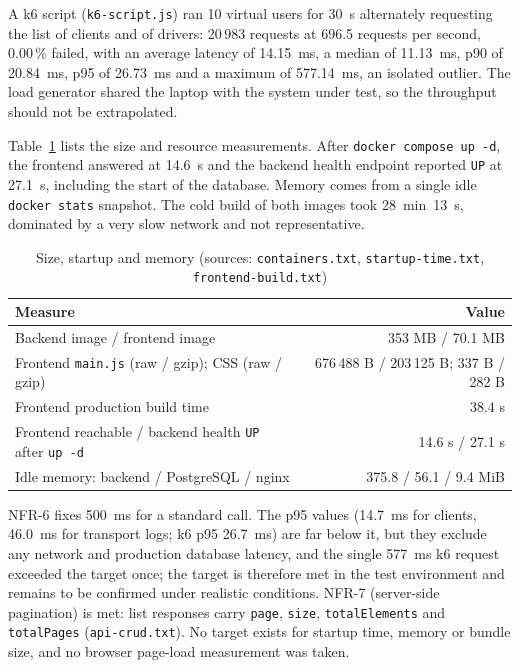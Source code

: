 A k6 script (\texttt{k6-script.js}) ran 10 virtual users for 30~s alternately requesting the list of clients and of drivers: 20\,983 requests at 696.5 requests per second, 0.00\,\% failed, with an average latency of 14.15~ms, a median of 11.13~ms, p90 of 20.84~ms, p95 of 26.73~ms and a maximum of 577.14~ms, an isolated outlier. The load generator shared the laptop with the system under test, so the throughput should not be extrapolated.

Table~\ref{tab:footprint} lists the size and resource measurements. After \texttt{docker compose up -d}, the frontend answered at 14.6~s and the backend health endpoint reported \texttt{UP} at 27.1~s, including the start of the database. Memory comes from a single idle \texttt{docker stats} snapshot. The cold build of both images took 28~min~13~s, dominated by a very slow network and not representative.

\begin{table}[H]
\centering\small
\caption{Size, startup and memory (sources: \texttt{containers.txt}, \texttt{startup-time.txt}, \texttt{frontend-build.txt})}\label{tab:footprint}
\begin{tabularx}{\linewidth}{@{}Xr@{}}
\toprule
\textbf{Measure} & \textbf{Value} \\
\midrule
Backend image / frontend image & 353 MB / 70.1 MB \\
Frontend \texttt{main.js} (raw / gzip); CSS (raw / gzip) & 676\,488 B / 203\,125 B; 337 B / 282 B \\
Frontend production build time & 38.4 s \\
Frontend reachable / backend health \texttt{UP} after \texttt{up -d} & 14.6 s / 27.1 s \\
Idle memory: backend / PostgreSQL / nginx & 375.8 / 56.1 / 9.4 MiB \\
\bottomrule
\end{tabularx}
\end{table}

NFR-6 fixes 500~ms for a standard call. The p95 values (14.7~ms for clients, 46.0~ms for transport logs; k6 p95 26.7~ms) are far below it, but they exclude any network and production database latency, and the single 577~ms k6 request exceeded the target once; the target is therefore met in the test environment and remains to be confirmed under realistic conditions. NFR-7 (server-side pagination) is met: list responses carry \texttt{page}, \texttt{size}, \texttt{totalElements} and \texttt{totalPages} (\texttt{api-crud.txt}). No target exists for startup time, memory or bundle size, and no browser page-load measurement was taken.

